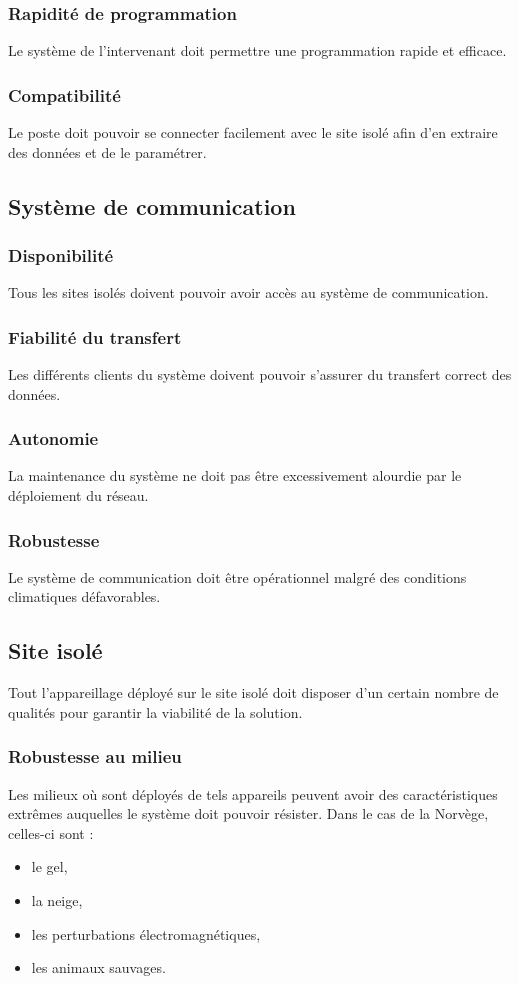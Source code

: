 \documentclass[a4paper, 11pt]{article}
\begin{document}
	\subsubsection{Rapidité de programmation}
	Le système de l'intervenant doit permettre une programmation rapide et efficace.
	\subsubsection{Compatibilité}
	Le poste doit pouvoir se connecter facilement avec le site isolé afin d'en extraire des données et de le paramétrer.

\subsection{Système de communication}
	\subsubsection{Disponibilité}
		Tous les sites isolés doivent pouvoir avoir accès au système de communication.
	\subsubsection{Fiabilité du transfert}
		Les différents clients du système doivent pouvoir s'assurer du transfert correct des données.
	\subsubsection{Autonomie}
		La maintenance du système ne doit pas être excessivement alourdie par le déploiement du réseau.
	\subsubsection{Robustesse}
		Le système de communication doit être opérationnel malgré des conditions climatiques défavorables.

\subsection{Site isolé}
	Tout l'appareillage déployé sur le site isolé doit disposer d'un certain nombre de qualités pour garantir la viabilité de la solution.
	\subsubsection{Robustesse au milieu}
	Les milieux où sont déployés de tels appareils peuvent avoir des caractéristiques extrêmes auquelles le système doit pouvoir résister. Dans le cas de la Norvège, celles-ci sont :
    \begin{itemize}
		\item le gel,
		\item la neige,
		\item les perturbations électromagnétiques,
		\item les animaux sauvages.
	\end{itemize}
\end{document}

